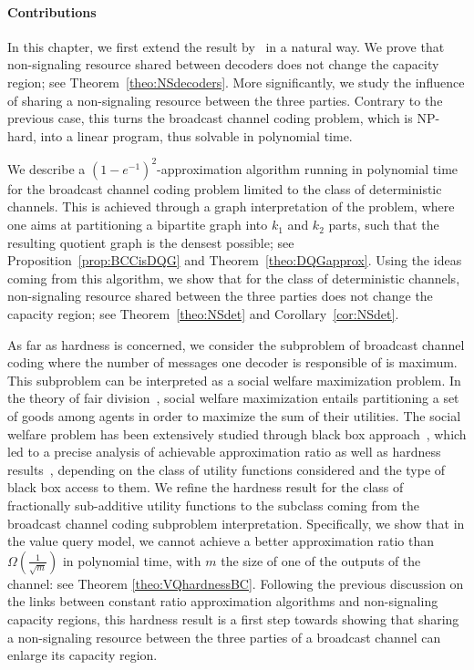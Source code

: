 \paragraph{Contributions} In this chapter, we first extend the result by~\cite{PDB21} in a natural way. We prove that non-signaling resource shared between decoders does not change the capacity region; see Theorem~\ref{theo:NSdecoders}. More significantly, we study the influence of sharing a non-signaling resource between the three parties. Contrary to the previous case, this turns the broadcast channel coding problem, which is \textrm{NP}-hard, into a linear program, thus solvable in polynomial time.

We describe a $(1-e^{-1})^2$-approximation algorithm running in polynomial time for the broadcast channel coding problem limited to the class of deterministic channels. This is achieved through a graph interpretation of the problem, where one aims at partitioning a bipartite graph into $k_1$ and $k_2$ parts, such that the resulting quotient graph is the densest possible; see Proposition~\ref{prop:BCCisDQG} and Theorem~\ref{theo:DQGapprox}. Using the ideas coming from this algorithm, we show that for the class of deterministic channels, non-signaling resource shared between the three parties does not change the capacity region; see Theorem~\ref{theo:NSdet} and Corollary~\ref{cor:NSdet}.

As far as hardness is concerned, we consider the subproblem of broadcast channel coding where the number of messages one decoder is responsible of is maximum. This subproblem can be interpreted as a social welfare maximization problem. In the theory of fair division~\cite{BT96,Moulin03}, social welfare maximization entails partitioning a set of goods among agents in order to maximize the sum of their utilities. The social welfare problem has been extensively studied through black box approach~\cite{BN05}, which led to a precise analysis of achievable approximation ratio as well as hardness results~\cite{DS06,MSV08}, depending on the class of utility functions considered and the type of black box access to them. We refine the hardness result for the class of fractionally sub-additive utility functions to the subclass coming from the broadcast channel coding subproblem interpretation. Specifically, we show that in the value query model, we cannot achieve a better approximation ratio than $\Omega\left(\frac{1}{\sqrt{m}}\right)$ in polynomial time, with $m$ the size of one of the outputs of the channel: see Theorem \ref{theo:VQhardnessBC}. Following the previous discussion on the links between constant ratio approximation algorithms and non-signaling capacity regions, this hardness result is a first step towards showing that sharing a non-signaling resource between the three parties of a broadcast channel can enlarge its capacity region.

